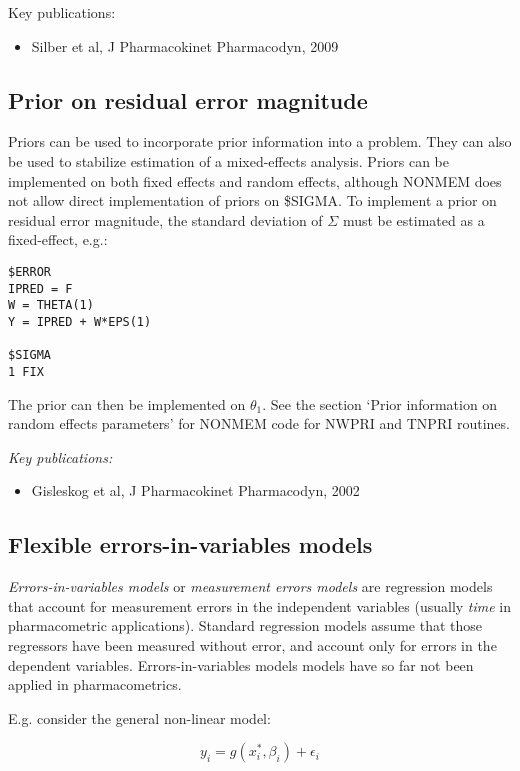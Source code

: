 \documentclass[a4paper,11pt]{article}
\begin{document}
Key publications:
\begin{itemize}
\item Silber et al, J Pharmacokinet Pharmacodyn, 2009
\end{itemize}

\subsection{Prior on residual error magnitude}
Priors can be used to incorporate prior information into a
problem. They can also be used to stabilize estimation of a
mixed-effects analysis. Priors can be implemented on both fixed
effects and random effects, although NONMEM does not allow direct
implementation of priors on \$SIGMA. To implement a prior on residual
error magnitude, the standard deviation of $\Sigma$ must be estimated
as a fixed-effect, e.g.:

\begin{lstlisting}
$ERROR
IPRED = F
W = THETA(1)
Y = IPRED + W*EPS(1)

$SIGMA
1 FIX
\end{lstlisting}

The prior can then be implemented on $\theta_1$. See the section
`Prior information on random effects parameters' for NONMEM code for
NWPRI and TNPRI routines.

\vspace{10pt}

\noindent \emph{Key publications:}
\begin{itemize}
\item Gisleskog et al, J Pharmacokinet Pharmacodyn, 2002
\end{itemize}


\subsection{Flexible errors-in-variables models}
\emph{Errors-in-variables models} or \emph{measurement errors models}
are regression models that account for measurement errors in the
independent variables (usually \emph{time} in pharmacometric
applications). Standard regression models assume that those regressors
have been measured without error, and account only for errors in the
dependent variables. Errors-in-variables models models have so far not
been applied in pharmacometrics.

\noindent E.g. consider the general non-linear model:

\begin{equation}
y_i = g(x_i^\ast, \beta_i) + \epsilon_i
\end{equation}
\end{document}
